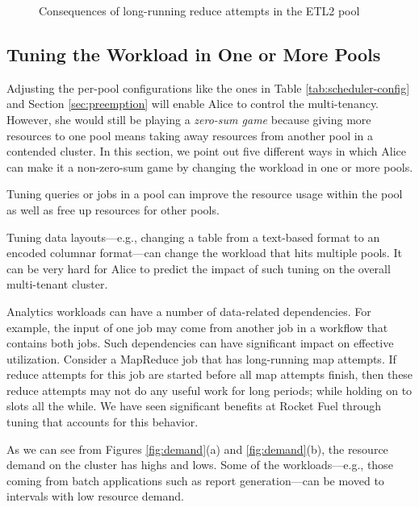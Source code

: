 \begin{figure}
  \centering
  \caption{Consequences of long-running reduce attempts 
           in the ETL2 pool}
  \label{fig:preemption}
  \vspace{-5mm}
\end{figure}

\subsection{Tuning the Workload in One or More Pools}

Adjusting the per-pool configurations like the ones
in Table \ref{tab:scheduler-config} and Section \ref{sec:preemption}
will enable Alice to control the multi-tenancy. However, 
she would still be playing a {\em zero-sum game} 
because giving more resources to one pool means 
taking away resources from another pool in a contended 
cluster. In this section, we point out five 
different ways in which Alice can make it a 
non-zero-sum game by changing the workload in one or more pools.

\vspace{1mm}
Tuning queries or jobs in a pool can improve the 
resource usage within the pool as well as free up resources 
for other pools. 

\vspace{1mm}
Tuning data layouts---e.g., changing a table from a text-based 
format to an encoded columnar format---can change the workload
that hits multiple pools. It can be very hard for Alice
to predict the impact of such tuning on the overall multi-tenant
cluster. 

\vspace{1mm}
Analytics workloads can have a number of data-related
dependencies. For example, the input of one job may come 
from another job in a workflow that contains both jobs.
Such dependencies can have significant impact on 
effective utilization. Consider a MapReduce job that 
has long-running map attempts. If reduce attempts for this 
job are started before all map attempts finish, then 
these reduce attempts may not do any useful work for long periods; 
while holding on to slots all the while. We have seen significant 
benefits at Rocket Fuel through tuning that accounts for this behavior. 

\vspace{1mm}
As we can see from Figures 
\ref{fig:demand}(a) and \ref{fig:demand}(b), the resource
demand on the cluster has highs and lows. Some of the workloads---e.g., 
those coming from batch applications such as report generation---can
be moved to intervals with low resource demand. 

